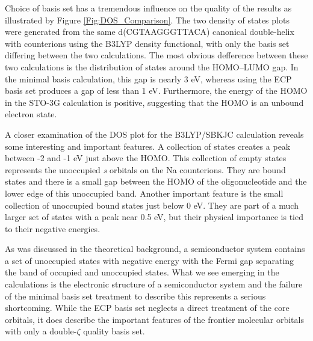 Choice of basis set has a tremendous influence on the quality of the
results as illustrated by Figure \ref{Fig:DOS_Comparison}.
The two density of states plots were
generated from the same d(CGTAAGGGTTACA) canonical double-helix with
counterions using the B3LYP density functional, with only the basis
set differing between the two calculations.  The most obvious
defference between these two calculations is the distribution of
states around the HOMO--LUMO gap. In the minimal basis calculation,
this gap is nearly 3 eV, whereas using the ECP basis set produces a
gap of less than 1 eV.  Furthermore, the energy of the HOMO in the
STO-3G calculation is positive, suggesting that the HOMO is an unbound
electron state.

A closer examination of the DOS plot for the B3LYP/SBKJC calculation
reveals some interesting and important features.  A collection of
states creates a peak between -2 and -1 eV just above the HOMO.  This
collection of empty states represents the unoccupied \textit{s}
orbitals on the Na counterions.  They are bound states and there is a
small gap between the HOMO of the oligonucleotide and the lower edge
of this unoccupied band.  Another important feature is the small
collection of unoccupied bound states just below 0 eV.  They are part
of a much larger set of states with a peak near 0.5 eV, but their
physical importance is tied to their negative energies.

As was discussed in the theoretical background, a semiconductor system
contains a set of unoccupied states with negative energy with the
Fermi gap separating the band of occupied and unoccupied states.  What
we see emerging in the calculations is the electronic structure of a
semiconductor system and the failure of the minimal basis set
treatment to describe this represents a serious shortcoming.  While
the ECP basis set neglects a direct treatment of the core orbitals, it
does describe the important features of the frontier molecular
orbitals with only a double-$\zeta$ quality basis set.

